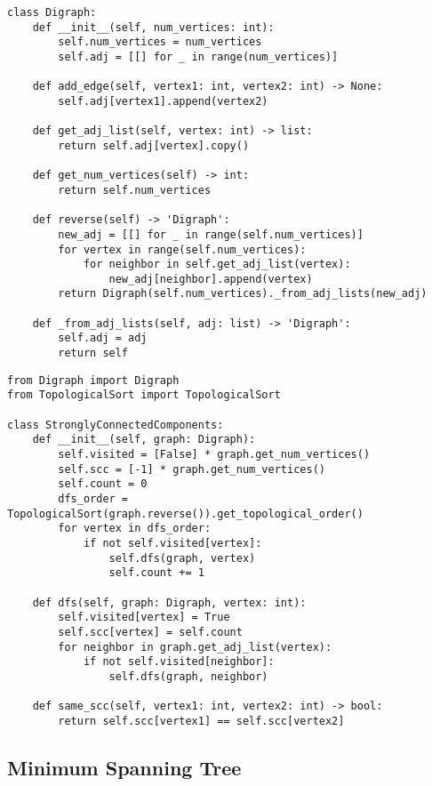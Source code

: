 \documentclass[a4paper]{article}
\begin{document}
\begin{lstlisting}
class Digraph:
    def __init__(self, num_vertices: int):
        self.num_vertices = num_vertices
        self.adj = [[] for _ in range(num_vertices)]

    def add_edge(self, vertex1: int, vertex2: int) -> None:
        self.adj[vertex1].append(vertex2)

    def get_adj_list(self, vertex: int) -> list:
        return self.adj[vertex].copy()

    def get_num_vertices(self) -> int:
        return self.num_vertices

    def reverse(self) -> 'Digraph':
        new_adj = [[] for _ in range(self.num_vertices)]
        for vertex in range(self.num_vertices):
            for neighbor in self.get_adj_list(vertex):
                new_adj[neighbor].append(vertex)
        return Digraph(self.num_vertices)._from_adj_lists(new_adj)

    def _from_adj_lists(self, adj: list) -> 'Digraph':
        self.adj = adj
        return self
\end{lstlisting}

\begin{lstlisting}
from Digraph import Digraph
from TopologicalSort import TopologicalSort

class StronglyConnectedComponents:
    def __init__(self, graph: Digraph):
        self.visited = [False] * graph.get_num_vertices()
        self.scc = [-1] * graph.get_num_vertices()
        self.count = 0
        dfs_order = TopologicalSort(graph.reverse()).get_topological_order()
        for vertex in dfs_order:
            if not self.visited[vertex]:
                self.dfs(graph, vertex)
                self.count += 1

    def dfs(self, graph: Digraph, vertex: int):
        self.visited[vertex] = True
        self.scc[vertex] = self.count
        for neighbor in graph.get_adj_list(vertex):
            if not self.visited[neighbor]:
                self.dfs(graph, neighbor)

    def same_scc(self, vertex1: int, vertex2: int) -> bool:
        return self.scc[vertex1] == self.scc[vertex2]
\end{lstlisting}

\subsection{Minimum Spanning Tree}
\end{document}
